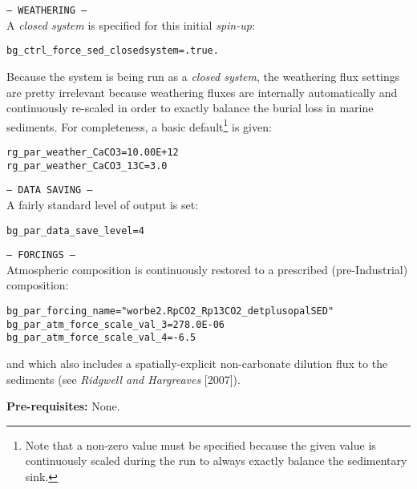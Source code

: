 \documentclass[10pt,twoside]{article}
\begin{document}
\begin{compactitem}
                \item \texttt{--- WEATHERING ---}
                \\ A \textit{closed system} is specified for this initial \textsl{spin-up}:
\vspace{-5pt}\begin{verbatim}
bg_ctrl_force_sed_closedsystem=.true.
                \end{verbatim}\vspace{-5pt}
Because the system is being run as a \textit{closed system}, the weathering flux settings are pretty irrelevant because weathering fluxes are internally automatically and continuously re-scaled in order to exactly balance the burial loss in marine sediments. For completeness, a basic default\footnote{Note that a non-zero value must be specified because the given value is continuously scaled during the run to always exactly balance the sedimentary sink.} is given:
\vspace{-5pt}\begin{verbatim}
rg_par_weather_CaCO3=10.00E+12
rg_par_weather_CaCO3_13C=3.0
                \end{verbatim}\vspace{-5pt}
                \item \texttt{--- DATA SAVING ---}
                \\ A fairly standard level of output is set:
\vspace{-5pt}\begin{verbatim}
bg_par_data_save_level=4
                \end{verbatim}\vspace{-5pt}
                \item \texttt{--- FORCINGS ---}
                \\ Atmospheric composition is continuously restored to a prescribed (pre-Industrial) composition:
\vspace{-5pt}\begin{verbatim}
bg_par_forcing_name="worbe2.RpCO2_Rp13CO2_detplusopalSED"
bg_par_atm_force_scale_val_3=278.0E-06
bg_par_atm_force_scale_val_4=-6.5
                \end{verbatim}\vspace{-5pt}
and which also includes a spatially-explicit non-carbonate dilution flux to the sediments (see \textit{Ridgwell and Hargreaves} [2007]).
        \end{compactitem}
        
\noindent \textbf{Pre-requisites:} None.
\end{document}
